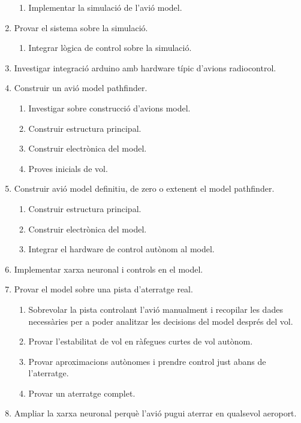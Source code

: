 \documentclass[10pt,a4paper,twocolumn,twoside]{article}
\begin{document}
\begin{enumerate}
\begin{enumerate}[label*=\arabic*.]
        \item Implementar la simulació de l'avió model.
    \end{enumerate}
    \item Provar el sistema sobre la simulació.
    \begin{enumerate}[label*=\arabic*.]
        \item Integrar lògica de control sobre la simulació.
    \end{enumerate}
    \item Investigar integració arduino amb hardware típic d'avions radiocontrol.
    \item Construir un avió model pathfinder.
    \begin{enumerate}[label*=\arabic*.]
        \item Investigar sobre construcció d'avions model.
        \item Construir estructura principal.
        \item Construir electrònica del model.
        \item Proves inicials de vol.
    \end{enumerate}
    \item Construir avió model definitiu, de zero o extenent el model pathfinder.
    \begin{enumerate}[label*=\arabic*.]
        \item Construir estructura principal.
        \item Construir electrònica del model.
        \item Integrar el hardware de control autònom al model.
    \end{enumerate}
    \item Implementar xarxa neuronal i controls en el model.
    \item Provar el model sobre una pista d'aterratge real.
    \begin{enumerate}[label*=\arabic*.]
        \item Sobrevolar la pista controlant l'avió manualment i recopilar les dades necessàries per a poder analitzar les decisions del model després del vol.
        \item Provar l'estabilitat de vol en ràfegues curtes de vol autònom.
        \item Provar aproximacions autònomes i prendre control just abans de l'aterratge.
        \item Provar un aterratge complet.
    \end{enumerate}
    \item Ampliar la xarxa neuronal perquè l'avió pugui aterrar en qualsevol aeroport.
\end{enumerate}
\end{document}

